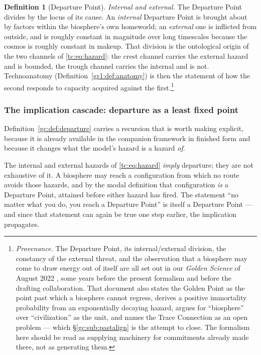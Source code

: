 \documentclass[11pt]{article}
\numberwithin{equation}{section}
\theoremstyle{plain}
\theoremstyle{definition}
\newtheorem{definition}[theorem]{Definition}
\theoremstyle{remark}
\begin{document}
\begin{definition}[Departure Point]
\emph{Internal and external.} The Departure Point divides by the
locus of its cause. An \emph{internal} Departure Point is brought about
by factors within the biosphere's own homeworld; an \emph{external} one
is inflicted from outside, and is roughly constant in magnitude over
long timescales because the cosmos is roughly constant in makeup. That
division is the ontological origin of the two channels of
\eqref{tc:eq:hazard}: the crest channel carries the external hazard and
is bounded, the trough channel carries the internal and is not.
Technoanatomy (Definition~\ref{gr1:def:anatomy}) is then the statement
of how the second responds to capacity acquired against the
first.\footnote{\emph{Provenance.} The Departure Point, its
internal/external division, the constancy of the external threat, and
the observation that a biosphere may come to draw energy out of itself
are all set out in our \emph{Golden Science} of August 2022
\cite{GoldenScience22}, some years before the present formalism and
before the drafting collaboration. That document also states the Golden Point as the point
past which a biosphere cannot regress, derives a positive immortality
probability from an exponentially decaying hazard, argues for
``biosphere'' over ``civilization'' as the unit, and names the Trace
Connection as an open problem --- which \S\ref{gc:sub:pastalign} is the
attempt to close. The formalism here should be read as supplying
machinery for commitments already made there, not as generating
them.}
\end{definition}

\subsubsection{The implication cascade: departure as a least fixed point}
\label{gc:subsub:cascade}

Definition~\ref{gc:def:departure} carries a recursion that is worth
making explicit, because it is already available in the companion
framework in finished form and because it changes what the model's
hazard is a hazard \emph{of}.

The internal and external hazards of \eqref{tc:eq:hazard} \emph{imply}
departure; they are not exhaustive of it. A biosphere may reach a
configuration from which no route avoids those hazards, and by the
modal definition that configuration \emph{is} a Departure Point,
attained before either hazard has fired. The statement ``no matter what
you do, you reach a Departure Point'' is itself a Departure Point ---
and since that statement can again be true one step earlier, the
implication propagates.
\end{document}
